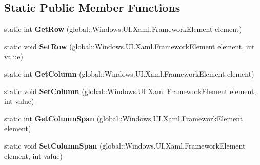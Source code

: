 \subsection*{Static Public Member Functions}
\begin{DoxyCompactItemize}
\item 
\mbox{\label{class_windows_1_1_u_i_1_1_xaml_1_1_controls_1_1_grid_a0cf3a18d57c7a539b00d9d58910fc197}} 
static int {\bfseries Get\+Row} (global\+::\+Windows.\+U\+I.\+Xaml.\+Framework\+Element element)
\item 
\mbox{\label{class_windows_1_1_u_i_1_1_xaml_1_1_controls_1_1_grid_a2d87af7c083d5c02d5eb9d3079e6c84f}} 
static void {\bfseries Set\+Row} (global\+::\+Windows.\+U\+I.\+Xaml.\+Framework\+Element element, int value)
\item 
\mbox{\label{class_windows_1_1_u_i_1_1_xaml_1_1_controls_1_1_grid_adeabc44596ae45474187e91cc83b4053}} 
static int {\bfseries Get\+Column} (global\+::\+Windows.\+U\+I.\+Xaml.\+Framework\+Element element)
\item 
\mbox{\label{class_windows_1_1_u_i_1_1_xaml_1_1_controls_1_1_grid_ad85395750dd3aafd10cf1aa7214b4051}} 
static void {\bfseries Set\+Column} (global\+::\+Windows.\+U\+I.\+Xaml.\+Framework\+Element element, int value)
\item 
\mbox{\label{class_windows_1_1_u_i_1_1_xaml_1_1_controls_1_1_grid_a166c94be72db2ad46f7ced5642ff2bb1}} 
static int {\bfseries Get\+Column\+Span} (global\+::\+Windows.\+U\+I.\+Xaml.\+Framework\+Element element)
\item 
\mbox{\label{class_windows_1_1_u_i_1_1_xaml_1_1_controls_1_1_grid_afb75a6ca2719689f16cf68ede010bdb2}} 
static void {\bfseries Set\+Column\+Span} (global\+::\+Windows.\+U\+I.\+Xaml.\+Framework\+Element element, int value)
\item 
\mbox{\label{class_windows_1_1_u_i_1_1_xaml_1_1_controls_1_1_grid_a0cf3a18d57c7a539b00d9d58910fc197}} 

\end{DoxyCompactItemize}

